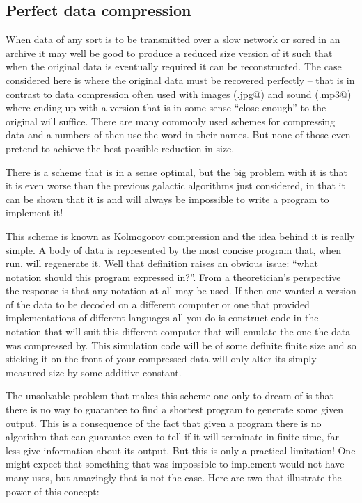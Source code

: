 \subsection{Perfect data compression}
When data of any sort is to be transmitted over a slow network or sored in
an archive it may well be good to produce a reduced size version of it such
that when the original data is eventually required it can be reconstructed.
The case considered here is where the original data must be recovered
perfectly -- that is in contrast to data compression often used with
images (\verb@.jpg@) and sound (\verb@.mp3@) where ending up with
a version that is in some sense ``close enough'' to the original will
suffice. There are many commonly used schemes for compressing data and
a numbers of then use the word \verb@zip@ in their names. But none of those
even pretend to achieve the best possible reduction in size.

There is a scheme that is in a sense optimal, but the big problem with it
is that it is even worse than the previous galactic algorithms just
considered, in that it can be shown that it is and will always be impossible
to write a program to implement it!

This scheme is known as Kolmogorov compression and the idea behind it is
really simple. A body of data is represented by the most concise program
that, when run, will regenerate it. Well that definition raises an obvious
issue: ``what notation should this program expressed in?''. From a
theoretician's perspective the response is that any notation at all
may be used. If then one wanted a version of the data to be decoded on
a different computer or one that provided implementations of different
languages all you do is construct code in the notation that will
suit this different computer that will emulate the one the data was
compressed by. This simulation code will be of some definite finite
size and so sticking it on the front of your compressed data will
only alter its simply-measured size by some additive constant.

The unsolvable problem that makes this scheme one only to dream of is
that there is no way to guarantee to find a shortest program
to generate some given output. This is a consequence of the fact that
given a program there is no algorithm that can guarantee even to tell
if it will terminate in finite time, far less give information
about its output. But this is only a practical limitation! One might
expect that something that was impossible to implement would not have many
uses, but amazingly that is not the case. Here are two that illustrate
the power of this concept:

